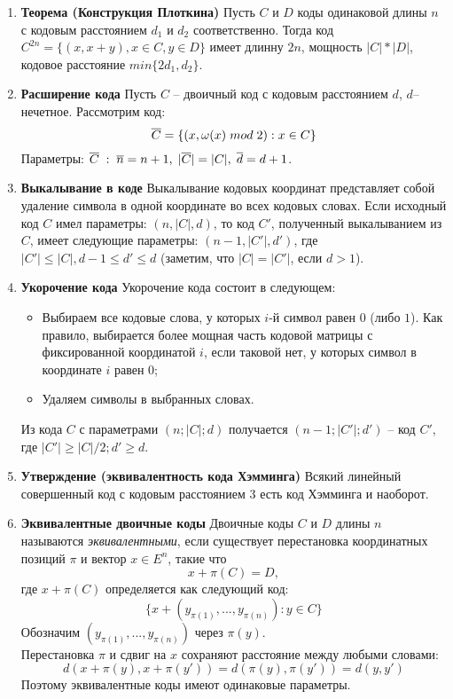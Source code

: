 \documentclass[a4paper, 12pt]{report}
\begin{document}
\begin{enumerate}
\item \textbf{Теорема (Конструкция Плоткина)}
Пусть $C$ и $D$ коды одинаковой длины $n$ с кодовым расстоянием $d_{1}$ и $d_{2}$ соответственно. Тогда код $C^{2n} = \lbrace(x, x+y), x\in C, y\in D\rbrace$ имеет длинну $2n$, мощность $|C|*|D|$, кодовое расстояние $min\lbrace 2d_{1}, d_{2}\rbrace$.

\item \textbf{Расширение кода} Пусть $C$ – двоичный код с кодовым расстоянием $d$, $d$–нечетное. Рассмотрим код:
\[\overline{C} = \lbrace (x, \omega (x)\hspace{0.1cm} mod\hspace{0.1cm} 2):x\in C\rbrace\]
Параметры: $\overline{C}\hspace{0.1cm}:\hspace{0.1cm} \overline{n} = n + 1, \hspace{0.1cm} |\overline{C}| = |C|,\hspace{0.1cm} \overline{d} = d + 1$.

\item \textbf{Выкалывание в коде} Выкалывание кодовых координат представляет собой удаление символа в одной координате во всех кодовых словах. Если исходный код $C$ имел параметры: $(n, |C|, d)$, то код $C'$, полученный выкалыванием из $C$, имеет следующие параметры: $(n - 1, |C'|, d')$, где $|C'| \leq |C|, d - 1 \leq d' \leq d$ (заметим, что $|C| = |C'|$, если $d > 1$).

\item \textbf{Укорочение кода} Укорочение кода состоит в следующем:
\begin{itemize}
\item Выбираем все кодовые слова, у которых $i$-й символ равен $0$ (либо $1$). Как правило, выбирается более мощная часть кодовой матрицы с фиксированной координатой $i$, если таковой нет, у которых символ в координате $i$ равен $0$;
\item Удаляем символы в выбранных словах.
\end{itemize}

Из кода $C$ с параметрами $(n; |C|; d)$ получается
$(n - 1; |C'|; d')$ – код $C'$, где $|C'| \geq |C|/2; d' \geq d$.

\item \textbf{Утверждение (эквивалентность кода Хэмминга)} Всякий линейный совершенный код с кодовым расстоянием $3$ есть код Хэмминга и наоборот.

\item \textbf{Эквивалентные двоичные коды} Двоичные коды $C$ и $D$ длины $n$ называются \textit{эквивалентными}, если существует перестановка координатных позиций $\pi$ и вектор $x \in E^{n}$, такие что
\[x + \pi(C) = D,\]
где $x + \pi(C)$ определяется как следующий код:
\[\lbrace x + (y_{\pi(1)}, ... , y_{\pi(n)}) : y\in C\rbrace\]
Обозначим $(y_{\pi(1)}, ... , y_{\pi(n)})$ через $\pi(y)$.\\
Перестановка $\pi$ и сдвиг на $x$ сохраняют расстояние между любыми словами:
\[d(x + \pi(y), x + \pi(y')) = d(\pi(y), \pi(y')) = d(y,y')\]
Поэтому эквивалентные коды имеют одинаковые параметры.


\end{enumerate}
\end{document}
